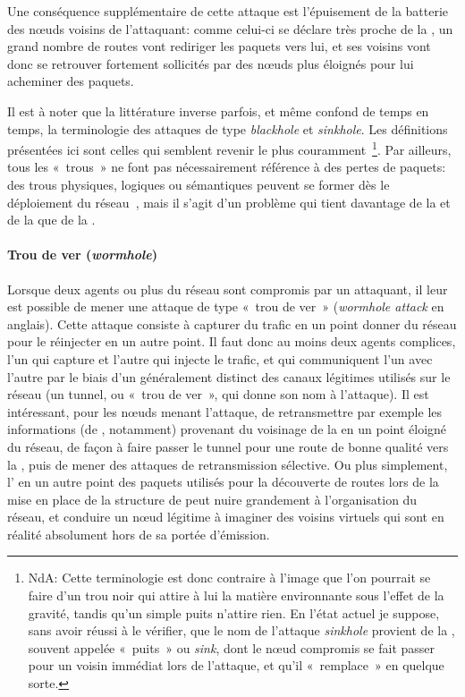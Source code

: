Une conséquence supplémentaire de cette attaque est l'épuisement de la batterie des nœuds voisins de l'attaquant: comme celui-ci se déclare très proche de la \sdb, un grand nombre de routes vont rediriger les paquets vers lui, et ses voisins vont donc se retrouver fortement sollicités par des nœuds plus éloignés pour lui acheminer des paquets.

Il est à noter que la littérature inverse parfois, et même confond de temps en temps, la terminologie des attaques de type \textit{blackhole} et \textit{sinkhole}.
Les définitions présentées ici sont celles qui semblent revenir le plus couramment%
\,\footnote{%
    NdA: Cette terminologie est donc contraire à l'image que l'on pourrait se faire d'un trou noir qui attire à lui la matière environnante sous l'effet de la gravité, tandis qu'un simple puits n'attire rien.
    En l'état actuel je suppose, sans avoir réussi à le vérifier, que le nom de l'attaque \textit{sinkhole} provient de la \sdb, souvent appelée « puits » ou \textit{sink}, dont le nœud compromis se fait passer pour un voisin immédiat lors de l'attaque, et qu'il « remplace » en quelque sorte.%
}.
Par ailleurs, tous les « trous » ne font pas nécessairement référence à des pertes de paquets: des trous physiques, logiques ou sémantiques peuvent se former dès le déploiement du réseau~\cite{JSM13}, mais il s'agit d'un problème qui tient davantage de la  et de la \resilience que de la \secu.

        \paragraph{Trou de ver (\textit{wormhole})}
Lorsque deux agents ou plus du réseau sont compromis par un attaquant, il leur est possible de mener une attaque de type « trou de ver » (\textit{wormhole attack} en anglais).
Cette attaque consiste à capturer du trafic en un point donner du réseau pour le réinjecter en un autre point.
Il faut donc au moins deux agents complices, l'un qui capture et l'autre qui injecte le trafic, et qui communiquent l'un avec l'autre par le biais d'un  généralement distinct des canaux légitimes utilisés sur le réseau (un tunnel, ou « trou de ver », qui donne son nom à l'attaque).
Il est intéressant, pour les nœuds menant l'attaque, de retransmettre par exemple les informations (de , notamment) provenant du voisinage de la \sdb en un point éloigné du réseau, de façon à faire passer le tunnel pour une route de bonne qualité vers la \sdb, puis de mener des attaques de retransmission sélective.
Ou plus simplement, l' en un autre point des paquets utilisés pour la découverte de routes lors de la mise en place de la structure de  peut nuire grandement à l'organisation du réseau, et conduire un nœud légitime à imaginer des voisins virtuels qui sont en réalité absolument hors de sa portée d'émission.

